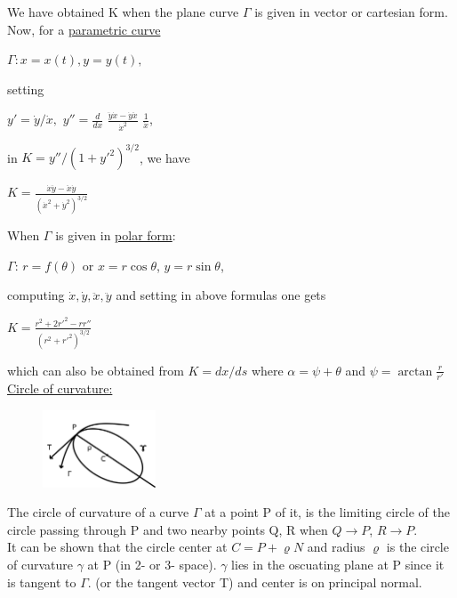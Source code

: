 \documentclass{article}
\begin{document}
    We have obtained K when the plane curve $\Gamma$ is given in vector or cartesian form. Now, for a \underline{parametric curve}
    \begin{center}
        $\Gamma : x=x(t), y=y(t),$\\
    \end{center}
    setting
    \begin{center}
        $y'=\dot y/\dot x,$ $y''=\frac{d}{dx}$   $\frac{\ddot y \dot x - \dot y \ddot x}{{\dot x}^2}$ $\frac{1}{\dot x}$,\\
    \end{center}
    in $K=y''/(1+{y'}^2)^{3/2}$, we have 
    \begin{center}
        $K=\frac{ \dot x \ddot y - \ddot x \dot y }{({\dot x}^2+{\dot y}^2)^{3/2}}$\\
    \end{center}
    
    When $\Gamma$ is given in \underline{polar form}:
    \begin{center}
        $\Gamma$: $r=f(\theta)$ or $x=r \cos\theta$, $y=r\sin\theta$,\\
    \end{center}
    computing $\dot x, \dot y, \ddot x, \ddot y$ and setting in above formulas one gets
    \begin{center}
        $K=\frac{r^2+{2r'}^2-rr''}{(r^2+{r'}^2)^{3/2}}$\\
    \end{center}
    which can also be obtained from $K=dx/ds$ where $\alpha=\psi+\theta$ and $\psi=\arctan\frac{r}{r'}$\\
    
    \underline{Circle of curvature:}\\
    
    \begin{figure} %
        \centering
        \includegraphics[width=0.3\textwidth]{images/b2p1-240-fig01.pdf}
    \end{figure}
    The circle of curvature of a curve $\Gamma$ at a point P of it, is the limiting circle of the circle passing through P and two nearby points Q, R when $Q\rightarrow P$, $R\rightarrow P$.\\
    
    It can be shown that the circle center at $C=P+\varrho N$ and radius $\varrho$ is the circle of curvature $\gamma$ at P (in 2- or 3- space). $\gamma$ lies in the oscuating plane at P since it is tangent to $\Gamma$. (or the tangent vector T) and center is on principal normal.
\end{document}
